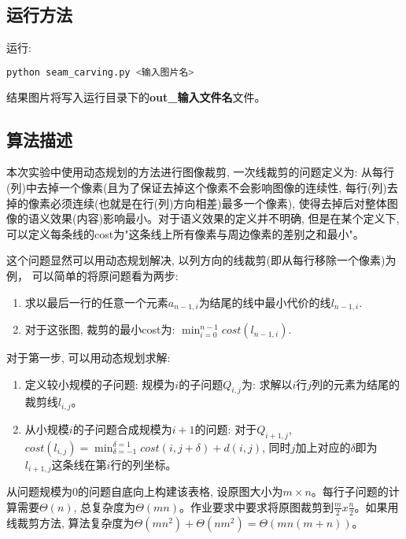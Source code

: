 \documentclass[paper=a4, fontsize=11pt]{scrartcl} %
\numberwithin{equation}{section} %
\numberwithin{figure}{section} %
\numberwithin{table}{section} %
\begin{document}
\subsection{运行方法}

运行:
\begin{lstlisting}[language=bash]
  python seam_carving.py <输入图片名>
\end{lstlisting}
结果图片将写入运行目录下的\textbf{out\_输入文件名}文件。

\subsection{算法描述}
本次实验中使用动态规划的方法进行图像裁剪, 一次线裁剪的问题定义为: 从每行(列)中去掉一个像素(且为了保证去掉这个像素不会影响图像的连续性, 每行(列)去掉的像素必须连续(也就是在行(列)方向相差)最多一个像素), 使得去掉后对整体图像的语义效果(内容)影响最小。对于语义效果的定义并不明确, 但是在某个定义下, 可以定义每条线的cost为"这条线上所有像素与周边像素的差别之和最小"。

这个问题显然可以用动态规划解决, 以列方向的线裁剪(即从每行移除一个像素)为例， 可以简单的将原问题看为两步:
\begin{enumerate}
\item 求以最后一行的任意一个元素$a_{n-1,i}$为结尾的线中最小代价的线$l_{n-1, i}$.
\item 对于这张图, 裁剪的最小cost为: $\min_{i=0}^{n-1} cost(l_{n-1, i})$.
\end{enumerate}

对于第一步, 可以用动态规划求解:
\begin{enumerate}
\item 定义较小规模的子问题: 规模为$i$的子问题$Q_{i,j}$为: 求解以$i$行$j$列的元素为结尾的裁剪线$l_{i,j}$。
\item 从小规模$i$的子问题合成规模为$i+1$的问题: 对于$Q_{i+1,j}$, $cost(l_{i,j}) = \min_{\delta=-1}^{\delta=1}{cost(i, j + \delta)} + d(i, j)$, 同时$j$加上对应的$\delta$即为$l_{i+1,j}$这条线在第$i$行的列坐标。
\end{enumerate}
从问题规模为0的问题自底向上构建该表格, 设原图大小为$m \times n$。每行子问题的计算需要$\Theta(n)$, 总复杂度为$\Theta(mn)$。作业要求中要求将原图裁剪到$\frac{m}{2} x \frac{n}{2}$。如果用线裁剪方法, 算法复杂度为$\Theta(mn^2) + \Theta(nm^2) = \Theta(mn(m+n))$。
\end{document}
